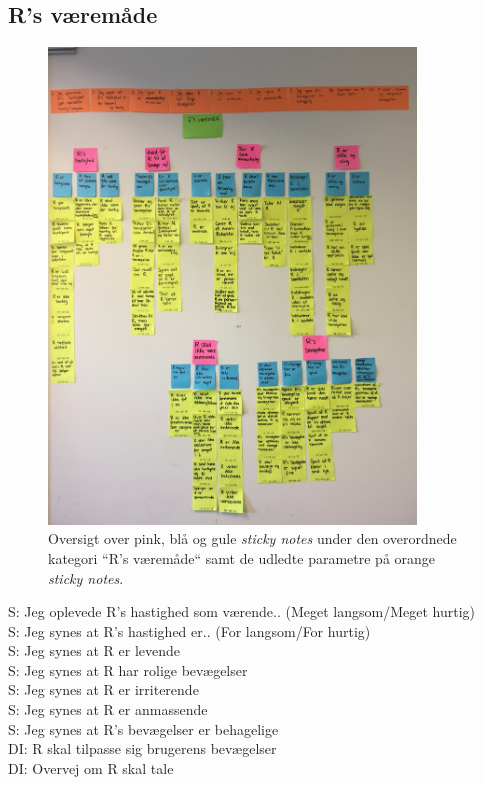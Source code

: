 \subsection{R's væremåde}
%
\begin{figure}[H]
\centering
\includegraphics[width = 0.87\textwidth]{Figure/AffinityDiagram/RsVaeremaade} 
\caption{Oversigt over pink, blå og gule \textit{sticky notes} under den overordnede kategori ``R's væremåde`` samt de udledte parametre på orange \textit{sticky notes}.}
\label{fig:AFRsVaeremaade}
\end{figure}
\noindent
%
S: Jeg oplevede R's hastighed som værende.. (Meget langsom/Meget hurtig)\\
S: Jeg synes at R's hastighed er.. (For langsom/For hurtig)\\
S: Jeg synes at R er levende\\
S: Jeg synes at R har rolige bevægelser\\
S: Jeg synes at R er irriterende\\
S: Jeg synes at R er anmassende\\
S: Jeg synes at R's bevægelser er behagelige\\
DI: R skal tilpasse sig brugerens bevægelser\\
DI: Overvej om R skal tale

